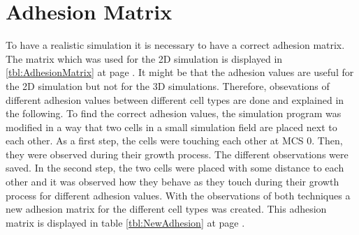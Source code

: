 \section{Adhesion Matrix}\label{sec:AdhesionMatrix}
To have a realistic simulation it is necessary to have a correct adhesion matrix. The matrix which was used for the 2D simulation is displayed in \ref{tbl:AdhesionMatrix} at page \pageref{tbl:AdhesionMatrix}. It might be that the adhesion values are useful for the 2D simulation but not for the 3D simulations. Therefore, obsevations of different adhesion values between different cell types are done and explained in the following. \newline
To find the correct adhesion values, the simulation program was modified in a way that two cells in a small simulation field are placed next to each other. As a first step, the cells were touching each other at \ac{MCS} 0. Then, they were observed during their growth process. The different observations were saved. In the second step, the two cells were placed with some distance to each other and it was observed how they behave as they touch during their growth process for different adhesion values. \newline
With the observations of both techniques a new adhesion matrix for the different cell types was created. This adhesion matrix is displayed in table \ref{tbl:NewAdhesion} at page \pageref{tbl:NewAdhesion}.


